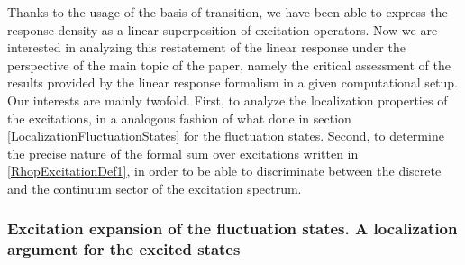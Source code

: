 \documentclass[a4paper]{article}
\begin{document}
Thanks to the usage of the basis of transition, we have been able to express the response density as a linear superposition of excitation operators. Now 
we are interested in analyzing this restatement of the linear response under the perspective of the main topic of the paper, namely the critical assessment 
of the results provided by the linear response formalism in a given computational setup. Our interests are mainly twofold. First, to analyze the localization 
properties of the excitations, in a analogous fashion of what done in section \ref{LocalizationFluctuationStates} for the fluctuation states. Second, to determine 
the precise nature of the formal sum over excitations written in \eqref{RhopExcitationDef1}, in order to be able to discriminate between the discrete and the 
continuum sector of the excitation spectrum.  

\subsubsection{Excitation expansion of the fluctuation states. A localization argument for the excited states}
\end{document}
